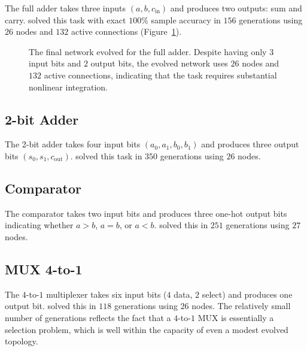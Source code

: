 The full adder takes three inputs $(a, b, c_{\text{in}})$ and produces
two outputs: sum and carry. \modnet{} solved this task with exact
$100\%$ sample accuracy in $156$ generations using $26$ nodes and $132$
active connections (Figure~\ref{fig:full-adder-spring}).

\begin{figure}[h]
  \centering
  \caption{The final network evolved for the full adder. Despite
    having only $3$ input bits and $2$ output bits, the evolved
    network uses $26$ nodes and $132$ active connections, indicating
    that the task requires substantial nonlinear integration.}
  \label{fig:full-adder-spring}
\end{figure}

\subsection{2-bit Adder}
\label{sec:results-adder2bit}

The 2-bit adder takes four input bits $(a_0, a_1, b_0, b_1)$ and
produces three output bits $(s_0, s_1, c_{\text{out}})$. \modnet{}
solved this task in $350$ generations using $26$ nodes.

\subsection{Comparator}
\label{sec:results-comparator}

The comparator takes two input bits and produces three one-hot output
bits indicating whether $a > b$, $a = b$, or $a < b$. \modnet{} solved
this in $251$ generations using $27$ nodes.

\subsection{MUX 4-to-1}
\label{sec:results-mux}

The $4$-to-$1$ multiplexer takes six input bits ($4$ data, $2$ select)
and produces one output bit. \modnet{} solved this in $118$
generations using $26$ nodes. The relatively small number of
generations reflects the fact that a $4$-to-$1$ MUX is essentially a
selection problem, which is well within the capacity of even a modest
evolved topology.


